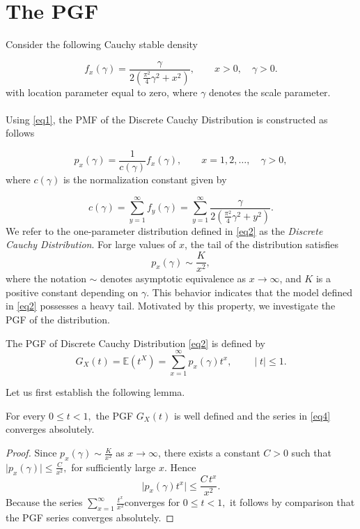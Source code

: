\documentclass[twoside]{article}
\begin{document}
 

\section{The PGF}
Consider the following Cauchy stable density \cite{Astola:2007, Nolan:2020, Zolotarev:1986} 

\begin{equation}\label{eq1} 
f_x(\gamma)=\frac{\gamma}{2\left(\frac{\pi^2}{4}\gamma^2+x^2\right)},\qquad x>0,\quad  \gamma>0.
\end{equation}
with location parameter equal to zero, where $\gamma$ denotes the scale parameter.\\
\\
Using \eqref{eq1}, the  PMF  of the Discrete Cauchy Distribution is constructed as follows \cite{Farbod:2008} 

\begin{equation}\label{eq2} 
p_x(\gamma)=\frac{1}{c(\gamma)}f_x(\gamma), \qquad x=1,2,\ldots,\quad \gamma>0, 
\end{equation} 
where $c(\gamma)$ is the normalization constant given by 

\begin{equation}\label{eq3} 
c(\gamma)=\sum_{y=1}^{\infty} f_y(\gamma) =\sum_{y=1}^{\infty} \frac{\gamma}{2\left(\frac{\pi^2}{4}\gamma^2+y^2\right)}. \end{equation} 
We refer to the one-parameter distribution defined in \eqref{eq2} as the \emph{Discrete Cauchy Distribution}. For large values of $x$, the tail of the distribution satisfies 
\[ 
p_x(\gamma) \sim \frac{K}{x^2}, 
\] 
where the notation $\sim$ denotes asymptotic equivalence as $x\to\infty$, and $K$ is a positive constant depending on $\gamma$. This behavior indicates that the model defined in \eqref{eq2} possesses a heavy tail. Motivated by this property, we investigate the  PGF  of the distribution.

The PGF  of Discrete Cauchy Distribution \eqref{eq2} is  defined by 
\begin{equation}\label{eq4} 
G_X(t)=\mathbb{E}(t^X)=\sum_{x=1}^{\infty} p_x(\gamma)t^x, \qquad  \mid t \mid \leq 1. 
\end{equation}

Let us first establish the following lemma.

\begin{lem} 
For every $0 \le t<1,$ the PGF $G_X(t)$  is well defined and the series in \eqref{eq4} converges absolutely.   
\end{lem} 
\begin{proof} 
Since $p_x(\gamma)\sim \frac{K}{x^2}$ as $x\to\infty$, there exists a constant $C>0$ such that  $\big|p_x(\gamma)\big|\le \frac{C}{x^2},$ 
for sufficiently large $x$. Hence
\[ 
\big|p_x(\gamma)t^x\big|\le \frac{C\,t^x}{x^2}. 
\] 
Because the series $\sum_{x=1}^{\infty} \frac{t^x}{x^2}$​ converges for $0 \le t<1,$ it follows by comparison that the PGF series converges absolutely.
\end{proof}
\end{document}
